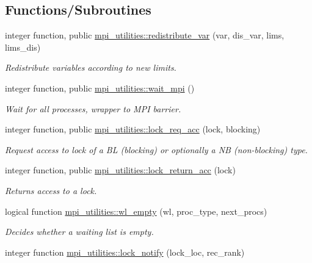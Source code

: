 \subsection*{Functions/\+Subroutines}
\begin{DoxyCompactItemize}
\item 
integer function, public \hyperlink{namespacempi__utilities_a128702990bd5fddc582e8fabcffc82b2}{mpi\+\_\+utilities\+::redistribute\+\_\+var} (var, dis\+\_\+var, lims, lims\+\_\+dis)
\begin{DoxyCompactList}\small\item\em Redistribute variables according to new limits. \end{DoxyCompactList}\item 
integer function, public \hyperlink{namespacempi__utilities_a790ea24d32dd0e249541c1e57cd85536}{mpi\+\_\+utilities\+::wait\+\_\+mpi} ()
\begin{DoxyCompactList}\small\item\em Wait for all processes, wrapper to M\+PI barrier. \end{DoxyCompactList}\item 
integer function, public \hyperlink{namespacempi__utilities_a5a789d05be41d6109c01f46cc98620c8}{mpi\+\_\+utilities\+::lock\+\_\+req\+\_\+acc} (lock, blocking)
\begin{DoxyCompactList}\small\item\em Request access to lock of a BL (blocking) or optionally a NB (non-\/blocking) type. \end{DoxyCompactList}\item 
integer function, public \hyperlink{namespacempi__utilities_a86f9982a0f92b51a916f832d9a3d8ba9}{mpi\+\_\+utilities\+::lock\+\_\+return\+\_\+acc} (lock)
\begin{DoxyCompactList}\small\item\em Returns access to a lock. \end{DoxyCompactList}\item 
logical function \hyperlink{namespacempi__utilities_a74e2e82b561f403ca8087c3925f76e29}{mpi\+\_\+utilities\+::wl\+\_\+empty} (wl, proc\+\_\+type, next\+\_\+procs)
\begin{DoxyCompactList}\small\item\em Decides whether a waiting list is empty. \end{DoxyCompactList}\item 
integer function \hyperlink{namespacempi__utilities_a263a30c79639d97f5faffdb566b5a811}{mpi\+\_\+utilities\+::lock\+\_\+notify} (lock\+\_\+loc, rec\+\_\+rank)

\end{DoxyCompactItemize}
